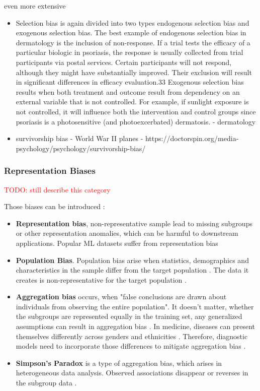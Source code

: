 \documentclass[12pt, a4paper, oneside]{book}   	%
\renewcommand{\todo}[1]{\textcolor{red}{TODO: #1}}
\renewcommand{\paragraph}[1]{%
	\subsubsection*{#1}%
}
\newif\ifrawcitationactive
\newcommand{\rawcitationend}{
	\color{black}\rawcitationactivefalse
}
\begin{document}
				even more extensive
				\begin{itemize}
					\item Selection bias is again divided into two types endogenous selection bias and exogenous selection bias. The best example of endogenous selection bias in dermatology is the inclusion of non-response. If a trial tests the efficacy of a particular biologic in psoriasis, the response is usually collected from trial participants via postal services. Certain participants will not respond, although they might have substantially improved. Their exclusion will result in significant differences in efficacy evaluation.33
					Exogenous selection bias results when both treatment and outcome result from dependency on an external variable that is not controlled. For example, if sunlight exposure is not controlled, it will influence both the intervention and control groups since psoriasis is a photosensitive (and photoexcerbated) dermatosis. \autocite{Chakraborty_2024} - dermatology
					
					
					\item survivorship bias - World War II planes \autocite{Silfwer_2017} - https://doctorspin.org/media-psychology/psychology/survivorship-bias/
				\end{itemize}
					
				\rawcitationend
					
				\paragraph{Representation Biases}
				\todo{still describe this category} 
				
				Those biases can be introduced :
				\begin{itemize}
					\item \textbf{Representation bias}, non-representative sample lead to missing subgroups or other representation anomalies, which can be harmful to downstream applications. Popular \gls{ML} datasets suffer from representation bias \autocites{Mehrabi_2021}{M142_Shankar_2017}
					\item \textbf{Population Bias}. Population bias arise when statistics, demographics and characteristics in the sample differ from the target population \autocite{M120_Olteanu_2019}. The data it creates is non-representative for the target population \autocite{Mehrabi_2021}.
					\item \textbf{Aggregation bias} occurs, when "false conclusions are drawn about individuals from observing the entire population". It doesn't matter, whether the subgroups are represented equally in the training set, any generalized assumptions can result in aggregation bias \autocite{Mehrabi_2021}. In medicine, diseases can present themselves differently across genders and ethnicities \autocite{M144_Suresh_2021}. Therefore, diagnostic models need to incorporate those differences to mitigate aggregation bias \autocite{Mehrabi_2021}.
					\item \textbf{Simpson's Paradox} is a type of aggregation bias, which arises in heterogeneous data analysis. Observed associations disappear or reverses in the subgroup data \autocite{Mehrabi_2021}.
				\end{itemize}
				
\end{document}

